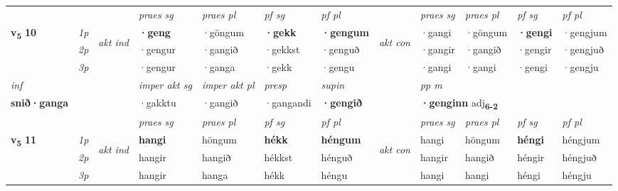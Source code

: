 \begin{longtable}[l]{X>{\footnotesize\itshape}llXXXXlXXXX}
\midrule

 & &   & \textit{praes sg}  & \textit{praes pl}    & \textit{ pf sg} & \textit{pf pl} & & \textit{praes sg}  & \textit{praes pl}    & \textit{pf sg} & \textit{pf pl }  \\ \cmidrule{4-7} \cmidrule{9-12}
 \multirow{2}{*}{{{\textbf{v{\textsubscript{5}}} \Large{\textbf{10}}}}}  & 1p & \multirow{3}{*}{\begin{turn}{90}\textit{akt ind}\end{turn}} & \textbf{·geng} & ·göngum & \textbf{·gekk} & \textbf{·gengum} & \multirow{3}{*}{\begin{turn}{90}\textit{akt con}\end{turn}} &·gangi & ·göngum & \textbf{·gengi} & ·gengjum\\*
 & 2p &  &  ·gengur  & ·gangið & ·gekkst & ·genguð & & ·gangir & ·gangið & ·gengir & ·gengjuð \\*
 & 3p &  & ·gengur & ·ganga & ·gekk & ·gengu & & ·gangi & ·gangi& ·gengi & ·gengju \\*
\cmidrule{4-7} \cmidrule{9-12}

   {\textit{inf}} & &  & \textit{imper akt sg} & \textit{imper akt pl}   & \textit{presp} & \textit{supin}  && \textit{pp m} \\*
  {\textbf{snið\allowbreak ·ganga}} & && ·gakktu  & ·gangið   & ·gangandi &  \textbf{·gengið}  && \multicolumn{2}{l}{\textbf{·genginn} adj\textbf{\textsubscript{6-2}}} \\*

\midrule

 & &   & \textit{praes sg}  & \textit{praes pl}    & \textit{ pf sg} & \textit{pf pl} & & \textit{praes sg}  & \textit{praes pl}    & \textit{pf sg} & \textit{pf pl }  \\ \cmidrule{4-7} \cmidrule{9-12}
 \multirow{2}{*}{{{\textbf{v{\textsubscript{5}}} \Large{\textbf{11}}}}}  & 1p & \multirow{3}{*}{\begin{turn}{90}\textit{akt ind}\end{turn}} & \textbf{hangi} & höngum & \textbf{hékk} & \textbf{héngum} & \multirow{3}{*}{\begin{turn}{90}\textit{akt con}\end{turn}} &hangi & höngum & \textbf{héngi} & héngjum\\*
 & 2p &  &  hangir  & hangið & hékkst & hénguð & & hangir & hangið & héngir & héngjuð \\*
 & 3p &  & hangir & hanga & hékk & héngu & & hangi & hangi& héngi & héngju \\*
\cmidrule{4-7} \cmidrule{9-12}


\end{longtable}
